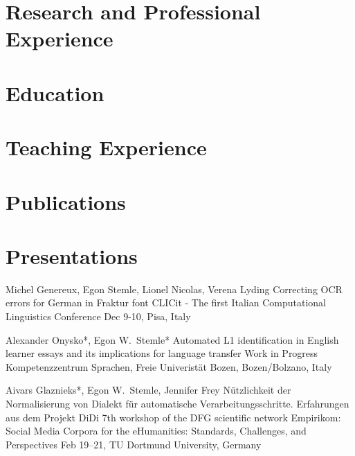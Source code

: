\documentclass[10pt,a4paper,sans]{moderncv}
\begin{document}
\makecvtitle

\section*{}


\section{Research and Professional Experience}


\section{Education}


\section{Teaching Experience}


\section{Publications}


\section{Presentations}
        {Michel Genereux, Egon Stemle, Lionel Nicolas, Verena Lyding}
        {Correcting OCR errors for German in Fraktur font}
        {CLICit - The first Italian Computational Linguistics Conference}
        {Dec 9-10, Pisa, Italy}
        {}

    
        {Alexander Onysko*, Egon W.~Stemle*}
        {Automated L1 identification in English learner essays and its
        implications for language transfer}
        {Work in Progress}
        {Kompetenzzentrum Sprachen, Freie Univeristät Bozen, Bozen/Bolzano, Italy}
        {}

        {Aivars Glaznieks*, Egon W.~Stemle, Jennifer Frey}
        {Nützlichkeit der Normalisierung von Dialekt für automatische
         Verarbeitungsschritte. Erfahrungen aus dem Projekt DiDi}
        {7th workshop of the DFG scientific network Empirikom: Social
        Media Corpora for the eHumanities: Standards, Challenges, and
        Perspectives}
        {Feb 19–21, TU Dortmund University, Germany}
        {}
\end{document}
